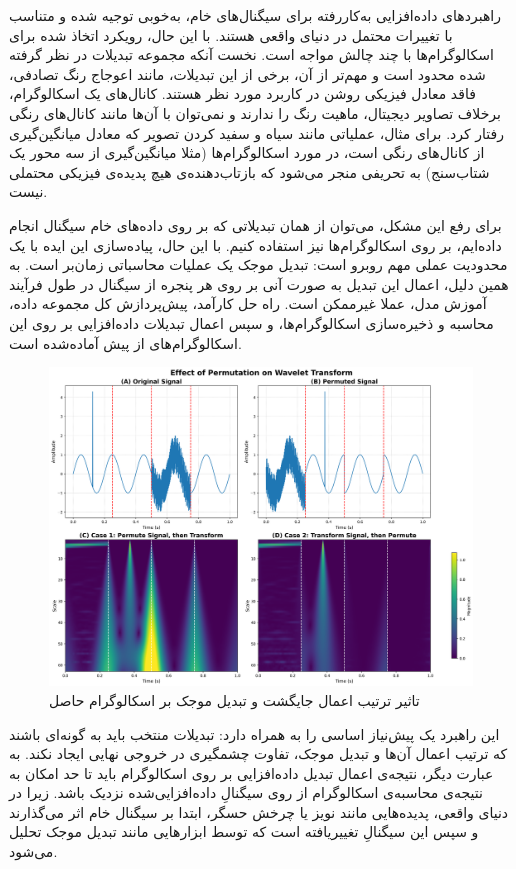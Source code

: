 راهبردهای داده‌افزایی به‌کاررفته برای سیگنال‌های خام، به‌خوبی توجیه شده و متناسب با تغییرات محتمل در دنیای واقعی هستند. با این حال، رویکرد اتخاذ شده برای اسکالوگرام‌ها با چند چالش مواجه است. نخست آنکه مجموعه تبدیلات در نظر گرفته شده محدود است و مهم‌تر از آن، برخی از این تبدیلات، مانند اعوجاج رنگ تصادفی، فاقد معادل فیزیکی روشن در کاربرد مورد نظر هستند. کانال‌های یک اسکالوگرام، برخلاف تصاویر دیجیتال، ماهیت رنگ را ندارند و نمی‌توان با آن‌ها مانند کانال‌های رنگی رفتار کرد. برای مثال، عملیاتی مانند سیاه و سفید کردن تصویر که معادل میانگین‌گیری از کانال‌های رنگی است، در مورد اسکالوگرام‌ها (مثلا میانگین‌گیری از سه محور یک شتاب‌سنج) به تحریفی منجر می‌شود که بازتاب‌دهنده‌ی هیچ پدیده‌ی فیزیکی محتملی نیست.

برای رفع این مشکل، می‌توان از همان تبدیلاتی که بر روی داده‌های خام سیگنال انجام داده‌ایم، بر روی اسکالوگرام‌ها نیز استفاده کنیم. با این حال، پیاده‌سازی این ایده با یک محدودیت عملی مهم روبرو است: تبدیل موجک یک عملیات محاسباتی زمان‌بر است. به همین دلیل، اعمال این تبدیل به صورت آنی بر روی هر پنجره از سیگنال در طول فرآیند آموزش مدل، عملا غیرممکن است. راه حل کارآمد، پیش‌پردازش کل مجموعه داده، محاسبه و ذخیره‌سازی اسکالوگرام‌ها، و سپس اعمال تبدیلات داده‌افزایی بر روی این اسکالوگرام‌های از پیش آماده‌شده است.

\begin{figure}[h!]
\centering
\includegraphics[width=1\textwidth]{Images/Chapter3/wavelet-permutation.png}
\caption{تاثیر ترتیب اعمال جایگشت و تبدیل موجک بر اسکالوگرام حاصل}
\label{fig:wavelet-permutation}
\end{figure}

این راهبرد یک پیش‌نیاز اساسی را به همراه دارد: تبدیلات منتخب باید به گونه‌ای باشند که ترتیب اعمال آن‌ها و تبدیل موجک، تفاوت چشمگیری در خروجی نهایی ایجاد نکند. به عبارت دیگر، نتیجه‌ی اعمال تبدیل داده‌افزایی بر روی اسکالوگرام باید تا حد امکان به نتیجه‌ی محاسبه‌ی اسکالوگرام از روی سیگنالِ داده‌افزایی‌شده نزدیک باشد. زیرا در دنیای واقعی، پدیده‌هایی مانند نویز یا چرخش حسگر، ابتدا بر سیگنال خام اثر می‌گذارند و سپس این سیگنالِ تغییریافته است که توسط ابزارهایی مانند تبدیل موجک تحلیل می‌شود.

